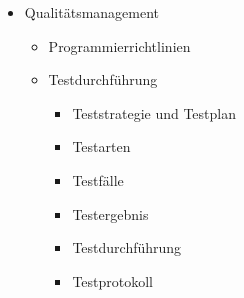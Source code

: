 \begin{itemize}
    \item Qualitätsmanagement
    \begin{itemize}
        \item Programmierrichtlinien
        \item Testdurchführung
            \begin{itemize}
                \item Teststrategie und Testplan
                \item Testarten
                \item Testfälle
                \item Testergebnis
                \item Testdurchführung
                \item Testprotokoll
            \end{itemize}
    \end{itemize}
\end{itemize}